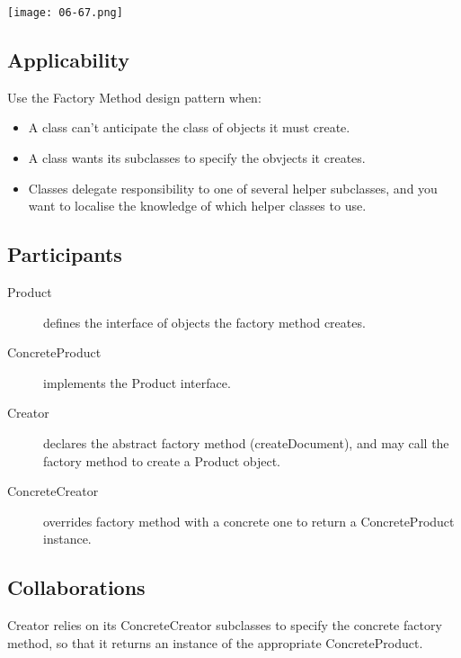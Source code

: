 \begin{center}
\texttt{[image: 06-67.png]}
\end{center}


\subsection{Applicability}

Use the Factory Method design pattern when:


\begin{itemize}
\item A class can't anticipate the class of objects it must create.
\item A class wants its subclasses to specify the obvjects it creates.
\item Classes delegate responsibility to one of several helper subclasses, and you want to localise the knowledge of which helper classes to use.
\end{itemize}

\subsection{Participants}

\begin{description}
\item[Product]
	
	defines the interface of objects the factory method creates.

\item[ConcreteProduct]

	implements the Product interface.

\item[Creator]
	
	declares the abstract factory method (createDocument), and may call the factory method to create a Product object.

\item[ConcreteCreator]
	
	overrides factory method with a concrete one to return a ConcreteProduct instance.
\end{description}

\subsection{Collaborations}

Creator relies on its ConcreteCreator subclasses to specify the concrete factory method, so that it returns an instance of the appropriate ConcreteProduct.


